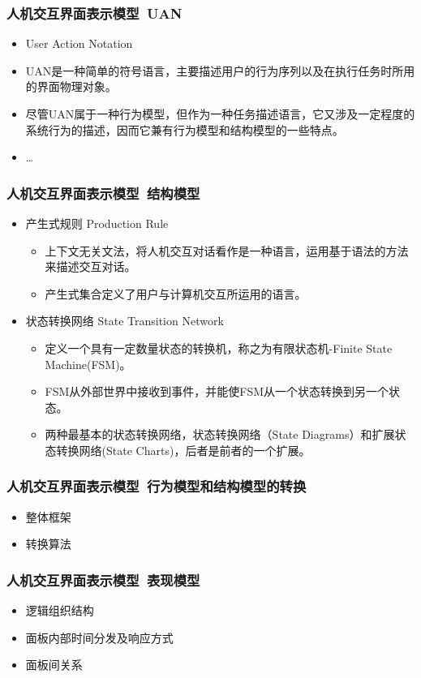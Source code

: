 \documentclass{beamer}
\begin{document}
\begin{frame}
	\frametitle{人机交互界面表示模型~{\small UAN}}
	\beamertemplatetransparentcovereddynamicmedium
	\begin{itemize}[<+->]
		\item User Action Notation~\cite{hartson1990uan}
		\item UAN是一种简单的符号语言，主要描述用户的行为序列以及在执行任务时所用的界面物理对象。 
		\item 尽管UAN属于一种行为模型，但作为一种任务描述语言，它又涉及一定程度的系统行为的描述，因而它兼有行为模型和结构模型的一些特点。
		\item \dots
	\end{itemize}
\end{frame}

\begin{frame}
	\frametitle{人机交互界面表示模型~{\small 结构模型}}
	\begin{itemize}
		\item 产生式规则 Production Rule
		\begin{itemize}
			\item 上下文无关文法，将人机交互对话看作是一种语言，运用基于语法的方法来描述交互对话。
			\item 产生式集合定义了用户与计算机交互所运用的语言。
		\end{itemize}
		\item 状态转换网络 State Transition Network
		\begin{itemize}
			\item 定义一个具有一定数量状态的转换机，称之为有限状态机-Finite State Machine(FSM)。
			\item FSM从外部世界中接收到事件，并能使FSM从一个状态转换到另一个状态。
			\item 两种最基本的状态转换网络，状态转换网络（State Diagrams）和扩展状态转换网络(State Charts)，后者是前者的一个扩展。
		\end{itemize}
	\end{itemize}
\end{frame}

\begin{frame}
	\frametitle{人机交互界面表示模型~{\small 行为模型和结构模型的转换}}
	\begin{itemize}
		\item 整体框架
		\item 转换算法
	\end{itemize}
\end{frame}

\begin{frame}
	\frametitle{人机交互界面表示模型~{\small 表现模型}}
	\begin{itemize}
		\item 逻辑组织结构
		\item 面板内部时间分发及响应方式
		\item 面板间关系
	\end{itemize}
\end{frame}
\end{document}
